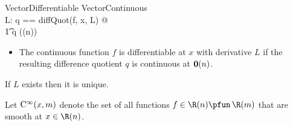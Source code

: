 \documentclass{amsart}
\begin{document}
\begin{schema}{VectorDifferentiable}
VectorContinuous \\
L: \Rinf \pfun \Rinf
\where
\LET q == diffQuot(f, x, L) @ \\
\t1	q \in \CzeroPointRtup(\zeroRtup(n))
\end{schema}

\begin{itemize}
\item The continuous function $f$ is differentiable at $x$ with derivative $L$ if the resulting
difference quotient $q$ is continuous at $\operatorname{\mathbf{0}}(n)$.
\end{itemize}

\begin{remark}
If $L$ exists then it is unique.
\end{remark}


Let $\operatorname{C^\infty}(x,m)$ denote the set of all functions $f \in \Rtup(n) \pfun \Rtup(m)$ that are smooth at $x \in \Rtup(n)$.

\printbibliography
\end{document}
